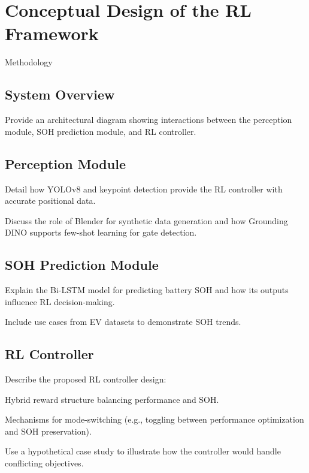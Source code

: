 
\chapter{Conceptual Design of the RL Framework}\label{ch:4}
\minitoc

Methodology

\newpage

\section{System Overview}

Provide an architectural diagram showing interactions between the perception module, SOH prediction module, and RL controller.


\section{Perception Module}

Detail how YOLOv8 and keypoint detection provide the RL controller with accurate positional data.

Discuss the role of Blender for synthetic data generation and how Grounding DINO supports few-shot learning for gate detection.


\section{SOH Prediction Module}

Explain the Bi-LSTM model for predicting battery SOH and how its outputs influence RL decision-making.

Include use cases from EV datasets to demonstrate SOH trends.


\section{RL Controller}

Describe the proposed RL controller design:

Hybrid reward structure balancing performance and SOH.

Mechanisms for mode-switching (e.g., toggling between performance optimization and SOH preservation).

Use a hypothetical case study to illustrate how the controller would handle conflicting objectives.

\endinput